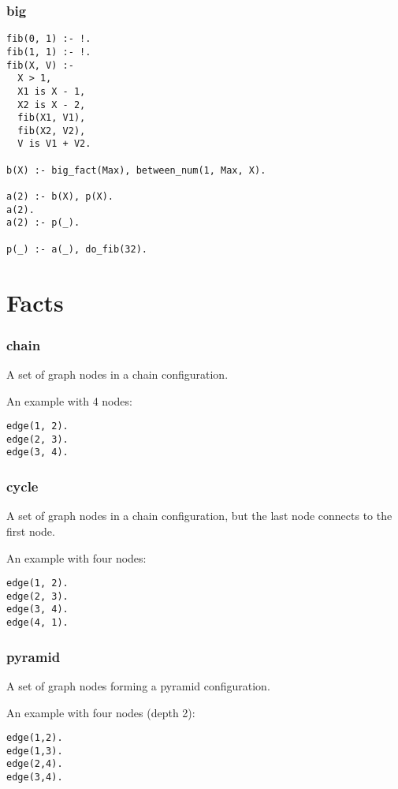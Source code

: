 \subsubsection*{big}

\begin{Verbatim}
fib(0, 1) :- !.
fib(1, 1) :- !.
fib(X, V) :-
  X > 1,
  X1 is X - 1,
  X2 is X - 2,
  fib(X1, V1),
  fib(X2, V2),
  V is V1 + V2.
  
b(X) :- big_fact(Max), between_num(1, Max, X).

a(2) :- b(X), p(X).
a(2).
a(2) :- p(_).

p(_) :- a(_), do_fib(32).
\end{Verbatim}

\section{Facts}

\subsubsection*{chain}

A set of graph nodes in a chain configuration.

An example with 4 nodes:

\begin{Verbatim}
edge(1, 2).
edge(2, 3).
edge(3, 4).
\end{Verbatim}

\subsubsection*{cycle}

A set of graph nodes in a chain configuration, but the last node connects to the first node.

An example with four nodes:

\begin{Verbatim}
edge(1, 2).
edge(2, 3).
edge(3, 4).
edge(4, 1).
\end{Verbatim}

\subsubsection*{pyramid}

A set of graph nodes forming a pyramid configuration.

An example with four nodes (depth 2):

\begin{Verbatim}
edge(1,2).
edge(1,3).
edge(2,4).
edge(3,4).
\end{Verbatim}

